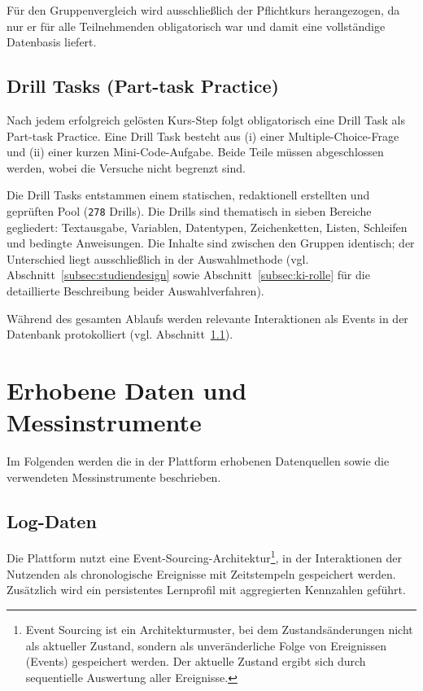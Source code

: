 Für den Gruppenvergleich wird ausschließlich der Pflichtkurs herangezogen, da nur er für alle Teilnehmenden obligatorisch war und damit eine vollständige Datenbasis liefert.

\subsection{Drill Tasks (Part-task Practice)}\label{subsec:drills_studie}

Nach jedem erfolgreich gelösten Kurs-Step folgt obligatorisch eine Drill Task als Part-task Practice. Eine Drill Task besteht aus (i) einer Multiple-Choice-Frage und (ii) einer kurzen Mini-Code-Aufgabe. Beide Teile müssen abgeschlossen werden, wobei die Versuche nicht begrenzt sind.

Die Drill Tasks entstammen einem statischen, redaktionell erstellten und geprüften Pool (\texttt{278} Drills). Die Drills sind thematisch in sieben Bereiche gegliedert: Textausgabe, Variablen, Datentypen, Zeichenketten, Listen, Schleifen und bedingte Anweisungen. Die Inhalte sind zwischen den Gruppen identisch; der Unterschied liegt ausschließlich in der Auswahlmethode (vgl. Abschnitt~\ref{subsec:studiendesign} sowie Abschnitt~\ref{subsec:ki-rolle} für die detaillierte Beschreibung beider Auswahlverfahren).

Während des gesamten Ablaufs werden relevante Interaktionen als Events in der Datenbank protokolliert (vgl. Abschnitt~\ref{subsec:logdaten}).


\section{Erhobene Daten und Messinstrumente}\label{sec:messinstrumente}

Im Folgenden werden die in der Plattform erhobenen Datenquellen sowie die verwendeten Messinstrumente beschrieben.

\subsection{Log-Daten}\label{subsec:logdaten}

Die Plattform nutzt eine Event-Sourcing-Architektur\footnote{Event Sourcing ist ein Architekturmuster, bei dem Zustandsänderungen nicht als aktueller Zustand, sondern als unveränderliche Folge von Ereignissen (Events) gespeichert werden. Der aktuelle Zustand ergibt sich durch sequentielle Auswertung aller Ereignisse.}, in der Interaktionen der Nutzenden als chronologische Ereignisse mit Zeitstempeln gespeichert werden. Zusätzlich wird ein persistentes Lernprofil mit aggregierten Kennzahlen geführt.

